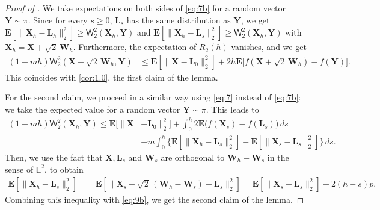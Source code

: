 \documentclass[aos,reqno]{imsart}
\newcommand\bL{\boldsymbol L}
\newcommand\bY{\boldsymbol Y}
\newcommand\bX{\boldsymbol X}
\newcommand\bW{\boldsymbol W}
\def\wass{\mathsf{W}}
\theoremstyle{definition}
\begin{document}
\begin{proof}[Proof of ]
    We take expectations on both sides of 
    \eqref{eq:7b} for a random vector $\bY\sim \pi$. 
    Since for every $s\geqslant 0$, $\bL_s$ has the 
    same distribution as $\bY$, we get 
    $\mathbf E[\|\bX_h-\bL_h\|_2^2]\ge \wass_2^2(\bX_h,\bY)$
    and $\mathbf E[\|\bX_h-\bL_s\|_2^2]\ge \wass_2^2(\bX_h,\bY)$
    with $\bX_h = \bX+\sqrt{2}\,\bW_h$.  
    Furthermore, the expectation of $R_2(h)$ vanishes, and
    we get
    \begin{align}
        (1+mh)\wass_2^2(\bX+\sqrt{2}\,\bW_h,\bY)
        &\leqslant 
        \mathbf E[\|\bX -\bL_0\|_2^2] + 2h\mathbf E\big[f(\bX+\sqrt{2}\,\bW_h) - f(\bY)\big].\label{eq:9}
    \end{align}    
    This coincides with \eqref{cor:1.0}, the first claim 
    of the lemma. 
    
    For the second claim, we proceed in a similar way using 
    \eqref{eq:7} instead of \eqref{eq:7b}: we take the expected 
    value for a random vector $\bY\sim \pi$. This leads to
    \begin{align}
        (1+mh)\wass_2^2(\bX_h,\bY) \leqslant \mathbf E[\|\bX 
        &- \bL_0\|_2^2] + \int_0^h2\mathbf E\big(f(\bX_s) - 
        f(\bL_s)\big)\,ds\\ 
        &+ m\int_0^h \big\{ 
        \mathbf E[\|\bX_h - \bL_s\|_2^2] - \mathbf E[\|
        \bX_s - \bL_s\|_2^2]\big\}\,ds
        .\label{eq:9b}
    \end{align}
    Then, we use the fact that $\bX,\bL_s$ and $\bW_s$ are 
    orthogonal to $\bW_h - \bW_s$ in the sense of $\mathbb 
    L^2$, to obtain
    \begin{align}
        \mathbf{E}[\|\bX_h-\bL_s\|_2^2] &= 
        \mathbf{E}[\|\bX_s + \sqrt{2}\,(\bW_h -
        \bW_s)-\bL_s\|_2^2]
         = \mathbf{E}[\|\bX_s-\bL_s\|_2^2] + 2(h-s)p.
    \end{align}
    Combining this inequality with \eqref{eq:9b}, we get 
    the second claim of the lemma.
\end{proof}
\end{document}

